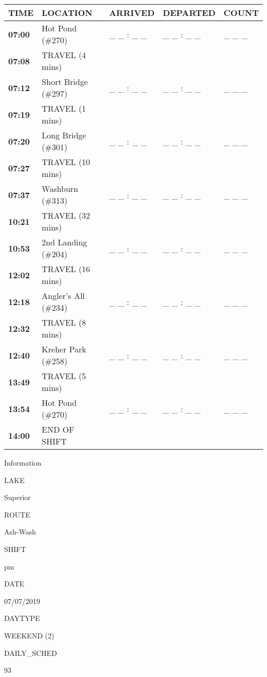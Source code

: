 \documentclass[]{article}
\begin{document}
\begin{tabular}{>{\bfseries}lllll}
\toprule
\textbf{TIME} & \textbf{LOCATION} & \textbf{ARRIVED} & \textbf{DEPARTED} & \textbf{COUNT}\\
\midrule
07:00 & Hot Pond (\#270) & \_ \_ : \_ \_ & \_ \_ : \_ \_ & \_ \_ \_\\
07:08 & TRAVEL (4 mins) &  &  & \\
07:12 & Short Bridge (\#297) & \_ \_ : \_ \_ & \_ \_ : \_ \_ & \_ \_ \_\\
07:19 & TRAVEL (1 mins) &  &  & \\
07:20 & Long Bridge (\#301) & \_ \_ : \_ \_ & \_ \_ : \_ \_ & \_ \_ \_\\
07:27 & TRAVEL (10 mins) &  &  & \\
07:37 & Washburn (\#313) & \_ \_ : \_ \_ & \_ \_ : \_ \_ & \_ \_ \_\\
10:21 & TRAVEL (32 mins) &  &  & \\
10:53 & 2nd Landing (\#204) & \_ \_ : \_ \_ & \_ \_ : \_ \_ & \_ \_ \_\\
12:02 & TRAVEL (16 mins) &  &  & \\
12:18 & Angler's All (\#234) & \_ \_ : \_ \_ & \_ \_ : \_ \_ & \_ \_ \_\\
12:32 & TRAVEL (8 mins) &  &  & \\
12:40 & Kreher Park (\#258) & \_ \_ : \_ \_ & \_ \_ : \_ \_ & \_ \_ \_\\
13:49 & TRAVEL (5 mins) &  &  & \\
13:54 & Hot Pond (\#270) & \_ \_ : \_ \_ & \_ \_ : \_ \_ & \_ \_ \_\\
14:00 & END OF SHIFT &  &  & \\
\bottomrule
\end{tabular}\newpage

Information

LAKE

Superior

ROUTE

Ash-Wash

SHIFT

pm

DATE

07/07/2019

DAYTYPE

WEEKEND (2)

DAILY\_SCHED

93

\vspace{24pt}
\end{document}

